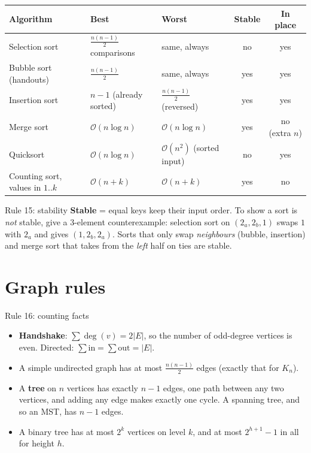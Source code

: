 \documentclass{fkt-notes}
\newcommand{\Oh}{\mathcal{O}}
\begin{document}
\begin{center}
\small
\begin{tabular}{@{}lllcc@{}}
\toprule
Algorithm & Best & Worst & Stable & In place \\
\midrule
Selection sort & $\frac{n(n-1)}2$ comparisons & same, always & no & yes \\
Bubble sort (handouts) & $\frac{n(n-1)}2$ & same, always & yes & yes \\
Insertion sort & $n-1$ (already sorted) & $\frac{n(n-1)}2$ (reversed) & yes & yes \\
Merge sort & $\Oh(n\log n)$ & $\Oh(n\log n)$ & yes & no (extra $n$) \\
Quicksort & $\Oh(n\log n)$ & $\Oh(n^2)$ (sorted input) & no & yes \\
Counting sort, values in $1..k$ & $\Oh(n+k)$ & $\Oh(n+k)$ & yes & no \\
\bottomrule
\end{tabular}
\end{center}

\begin{rulebox}{Rule 15: stability}
\textbf{Stable} = equal keys keep their input order. To show a sort is \emph{not} stable, give a 3-element counterexample: selection sort on $(2_a,2_b,1)$ swaps $1$ with $2_a$ and gives $(1,2_b,2_a)$. Sorts that only swap \emph{neighbours} (bubble, insertion) and merge sort that takes from the \emph{left} half on ties are stable.
\end{rulebox}

\section{Graph rules}
\label{sec:graphs}

\begin{rulebox}{Rule 16: counting facts}
\begin{itemize}[leftmargin=1.5em,itemsep=1pt]
  \item \textbf{Handshake}: $\sum\deg(v)=2|E|$, so the number of odd-degree vertices is even. Directed: $\sum\text{in}=\sum\text{out}=|E|$.
  \item A simple undirected graph has at most $\frac{n(n-1)}2$ edges (exactly that for $K_n$).
  \item A \textbf{tree} on $n$ vertices has exactly $n-1$ edges, one path between any two vertices, and adding any edge makes exactly one cycle. A spanning tree, and so an MST, has $n-1$ edges.
  \item A binary tree has at most $2^k$ vertices on level $k$, and at most $2^{h+1}-1$ in all for height $h$.
\end{itemize}
\end{rulebox}
\end{document}
